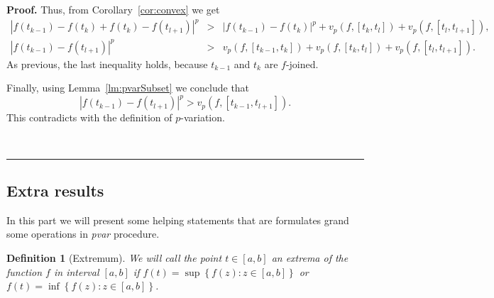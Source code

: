 \documentclass[12pt, a4paper]{article}
\newtheorem{definition}[theorem]{Definition}
\newenvironment{proof}[1][Proof]{\noindent \textbf{#1.} }{\  \rule{0.5em}{0.5em}}
\numberwithin{equation}{section}
\begin{document}
\begin{proof}
  Thus, from Corollary~\ref{cor:convex} we get
  \begin{eqnarray*}
    |f(t_{k-1})-f(t_k)+f(t_k)-f(t_{l+1})|^p&>&
      |f(t_{k-1})-f(t_{k})|^p+v_p(f,[t_k,t_l])+v_p(f,[t_l,t_{l+1}]), \\
    |f(t_{k-1})-f(t_{l+1})|^p &>& v_p(f,[t_{k-1},t_{k}]) 
      + v_p(f,[t_k,t_l])+v_p(f,[t_l,t_{l+1}]).
  \end{eqnarray*}  
  As previous, the last inequality holds, 
  because $t_{k-1}$ and $t_{k}$ are
  $f$-joined.

  Finally, using Lemma~\ref{lm:pvarSubset} we conclude that
  $$|f(t_{k-1})-f(t_{l+1})|^p > v_p(f,[t_{k-1},t_{l+1}]).$$
  This contradicts with the definition of $p$-variation.    
  
  
\end{proof}



\subsection{Extra results}

In this part we will present some helping statements that are 
formulates grand some operations in \emph{pvar} procedure.

\begin{definition}[Extremum]\label{def:extremum}
  We will call the point $t \in  [a,b]$ an \emph{extrema}
  of the function $f$ in interval $[a,b]$ if   
  $f(t)=\sup \left\{ f(z):z\in \left[ a,b\right]
  \right\} $ or 
  $f(t)=\inf \left\{ f(z):z\in \left[ a,b\right] \right\} $.
\end{definition}
\end{document}
